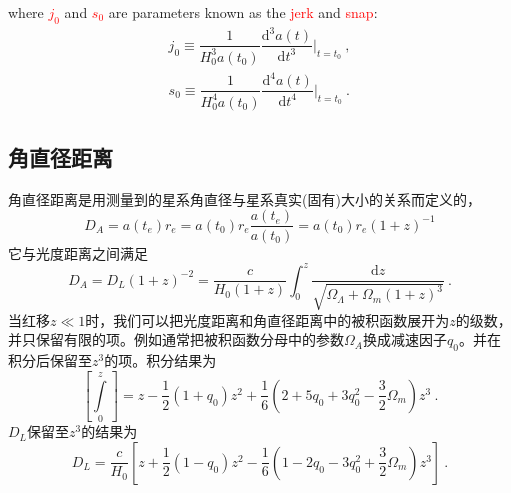 \documentclass[12pt,a4paper]{article}
\newcommand{\dif}{\mathrm{d}}
\begin{document}
where \textcolor{red}{$j_0$} and \textcolor{red}{$s_0$} are parameters known as the \textcolor{red}{jerk} and \textcolor{red}{snap}:
\begin{align*}
j_0 \equiv \dfrac{1}{H_0^3 a(t_0)} \dfrac{\dif^3 a(t)}{\dif t^3} \Big|_{t=t_0} ~, \\
s_0 \equiv \dfrac{1}{H_0^4 a(t_0)} \dfrac{\dif^4 a(t)}{\dif t^4} \Big|_{t=t_0} ~.
\end{align*}





































\subsection{角直径距离}
\cite{2010宇宙大尺度结构的形成, 2012宇宙大尺度结构的形成} 角直径距离是用测量到的星系角直径与星系真实(固有)大小的关系而定义的，
\begin{equation}
D_A = a(t_e) r_e = a(t_0) r_e \dfrac{a(t_e)}{a(t_0)} = a(t_0) r_e (1+z)^{-1} 
\end{equation}
它与光度距离之间满足
\begin{equation}
D_A = D_L (1+z)^{-2} = \dfrac{c}{H_0(1+z)} \int_0^z \dfrac{\dif z}{\sqrt{\Omega_\Lambda  +\Omega_m (1+z)^{3} } } ~.
\end{equation}
当红移$z \ll 1$时，我们可以把光度距离和角直径距离中的被积函数展开为$z$的级数，并只保留有限的项。例如通常把被积函数分母中的参数$\Omega_A$换成减速因子$q_0$。并在积分后保留至$z^3$的项。积分结果为
\begin{equation}
\left[ \int\limits_0^z \right] = z - \dfrac{1}{2}(1+q_0) z^2 +\dfrac{1}{6} \left(2+5q_0 +3q_0^2 -\dfrac{3}{2} \Omega_m \right) z^3 ~.
\end{equation}
$D_L$保留至$z^3$的结果为
\begin{equation}
D_L = \dfrac{c}{H_0} \left[ z +\dfrac{1}{2}(1-q_0) z^2 -\dfrac{1}{6} \left(1-2q_0 -3q_0^2 +\dfrac{3}{2} \Omega_m \right) z^3 \right] ~.
\end{equation}
\end{document}
